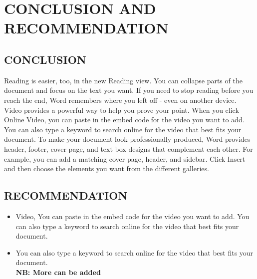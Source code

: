 \documentclass[12pt,a4paper]{report}
\begin{document}
\chapter{CONCLUSION AND RECOMMENDATION}
\section{CONCLUSION}
Reading is easier, too, in the new Reading view. You can collapse parts of the document and focus on the text you want. If you need to stop reading before you reach the end, Word remembers where you left off - even on another device.
Video provides a powerful way to help you prove your point. When you click Online Video, you can paste in the embed code for the video you want to add. You can also type a keyword to search online for the video that best fits your document.
To make your document look professionally produced, Word provides header, footer, cover page, and text box designs that complement each other. For example, you can add a matching cover page, header, and sidebar. Click Insert and then choose the elements you want from the different galleries.

\section{RECOMMENDATION}

\begin{itemize}  %
    \item
    Video, You can paste in the embed code for the video you want to add. You can also type a keyword to search online for the video that best fits your document.
    \item
    You can also type a keyword to search online for the video that best fits your document.\\
    \textbf{NB: More can be added}
    
\end{itemize}
\end{document}
